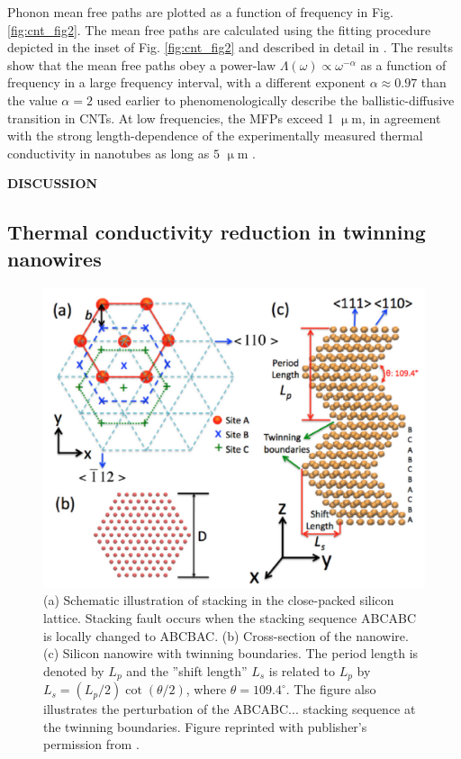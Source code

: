 Phonon mean free paths are plotted as a function of frequency in Fig. \ref{fig:cnt_fig2}. The mean free paths are calculated using the fitting procedure depicted in the inset of Fig. \ref{fig:cnt_fig2} and described in detail in . The results show that the mean free paths obey a power-law $\Lambda(\omega)\propto \omega^{-\alpha}$ as a function of frequency in a large frequency interval, with a different exponent $\alpha\approx 0.97$ than the value $\alpha=2$ used earlier \cite{wang06_apl} to phenomenologically describe the ballistic-diffusive transition in CNTs. At low frequencies, the MFPs exceed 1 $\upmu$m, in agreement with the strong length-dependence of the experimentally measured thermal conductivity in nanotubes as long as $5$ $\upmu$m \cite{chang08}.

\textbf{DISCUSSION}

\subsection{Thermal conductivity reduction in twinning nanowires}

\label{sec:results_twinning}

\begin{figure}[tb]
 \begin{center}
  \includegraphics[width=.89\columnwidth]{pics/twinning_fig1.pdf} 
  \caption{(a) Schematic illustration of stacking in the close-packed silicon lattice. Stacking fault occurs when the stacking sequence ABCABC is locally changed to ABCBAC. (b) Cross-section of the nanowire. (c) Silicon nanowire with twinning boundaries. The period length is denoted by $L_p$ and the ''shift length'' $L_s$ is related to $L_p$ by $L_s=(L_p/2)\cot(\theta/2)$, where $\theta=109.4^{\circ}$. The figure also illustrates the perturbation of the ABCABC... stacking sequence at the twinning boundaries. Figure reprinted with publisher's permission from .}  
\label{fig:twinning_fig1}
 \end{center}
\end{figure}

